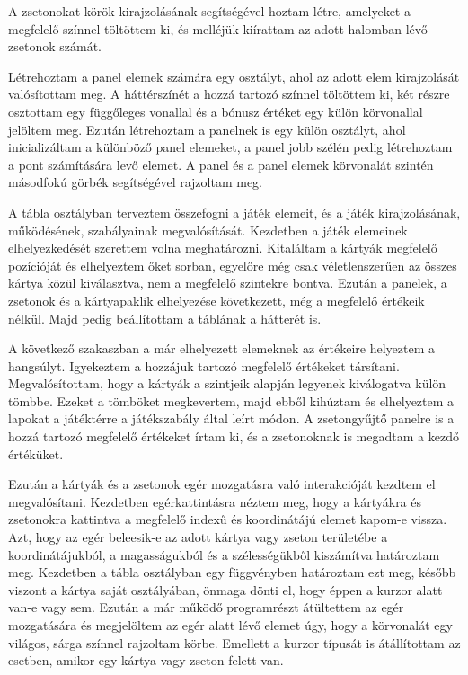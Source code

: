 A zsetonokat körök kirajzolásának segítségével hoztam létre, amelyeket a megfelelő színnel töltöttem ki, és melléjük kiírattam az adott halomban lévő zsetonok számát.


Létrehoztam a panel elemek számára egy osztályt, ahol az adott elem kirajzolását valósítottam meg. A háttérszínét a hozzá tartozó színnel töltöttem ki, két részre osztottam egy függőleges vonallal és a bónusz értéket egy külön körvonallal jelöltem meg. Ezután létrehoztam a panelnek is egy külön osztályt, ahol inicializáltam a különböző panel elemeket, a panel jobb szélén pedig létrehoztam a pont számítására levő elemet. A panel és a panel elemek körvonalát szintén másodfokú görbék segítségével rajzoltam meg.

A tábla osztályban terveztem összefogni a játék elemeit, és a játék kirajzolásának, működésének, szabályainak megvalósítását. Kezdetben a játék elemeinek elhelyezkedését szerettem volna meghatározni. Kitaláltam a kártyák megfelelő pozícióját és elhelyeztem őket sorban, egyelőre még csak véletlenszerűen az összes kártya közül kiválasztva, nem a megfelelő szintekre bontva. Ezután a panelek, a zsetonok és a kártyapaklik elhelyezése következett, még a megfelelő értékeik nélkül. Majd pedig beállítottam a táblának a hátterét is.\par

A következő szakaszban a már elhelyezett elemeknek az értékeire helyeztem a hangsúlyt. Igyekeztem a hozzájuk tartozó megfelelő értékeket társítani. Megvalósítottam, hogy a kártyák a szintjeik alapján legyenek kiválogatva külön tömbbe. Ezeket a tömböket megkevertem, majd ebből kihúztam és elhelyeztem a lapokat a játéktérre a játékszabály által leírt módon. A zsetongyűjtő panelre is a hozzá tartozó megfelelő értékeket írtam ki, és a zsetonoknak is megadtam a kezdő értéküket.\par

Ezután a kártyák és a zsetonok egér mozgatásra való interakcióját kezdtem el megvalósítani. Kezdetben egérkattintásra néztem meg, hogy a kártyákra és zsetonokra kattintva a megfelelő indexű és koordinátájú elemet kapom-e vissza. Azt, hogy az egér beleesik-e az adott kártya vagy zseton területébe a koordinátájukból, a magasságukból és a szélességükből kiszámítva határoztam meg. Kezdetben a tábla osztályban egy függvényben határoztam ezt meg, később viszont a kártya saját osztályában, önmaga dönti el, hogy éppen a kurzor alatt van-e vagy sem. Ezután a már működő programrészt átültettem az egér mozgatására és megjelöltem az egér alatt lévő elemet úgy, hogy a körvonalát egy világos, sárga színnel rajzoltam körbe. Emellett a kurzor típusát is átállítottam az esetben, amikor egy kártya vagy zseton felett van.

